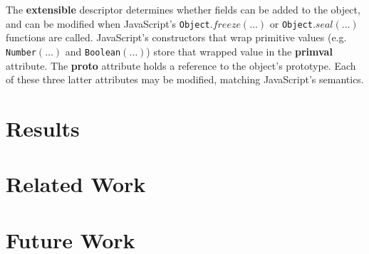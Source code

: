 \documentclass[preprint,9pt]{sigplanconf} %
\begin{document}
The {\bf{extensible}} descriptor determines whether fields can be
added to the object, and can be modified when JavaScript's
\texttt{Object}.$freeze(\dots)$ or \texttt{Object}.$seal(\dots)$
functions are called. JavaScript's constructors that wrap primitive
values (e.g. \texttt{Number}$(\dots)$ and \texttt{Boolean}$(\dots)$)
store that wrapped value in the {\bf{primval}} attribute. The
{\bf{proto}} attribute holds a reference to the object's
prototype. Each of these three latter attributes may be modified,
matching JavaScript's semantics.


\begin{comment}
\begin{figure}
\small
\[
\begin{array}{rcl}
\mtodo{Transliterate the ADTs}
\end{array}
\]
\caption{Abstract machine components}
\label{fig:amc}
\end{figure}

\begin{figure}
\small
\[
\begin{array}{rcl}
\mtodo{Transliterate step.ml}
\end{array}
\]
\caption{Abstracted abstract machine}
\label{fig:aam}
\end{figure}
\end{comment}

\section{Results}

\section{Related Work}


\section{Future Work}
\end{document}
